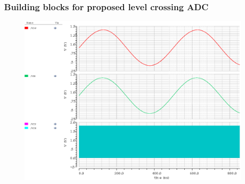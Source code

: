 \documentclass{beamer}
\begin{document}
\begin{frame}
	\frametitle{Building blocks for proposed level crossing ADC} \footnotesize
	\begin{center}
		\begin{figure}
			\includegraphics[width=10 cm, height=6 cm,angle=360]{Figures/STAH.eps}\\
		\end{figure}
		\scriptsize{ \color{blue}{Simulation results of Track and Hold used in proposed ADC architecture}}
	\end{center}
\end{frame}
\end{document}

